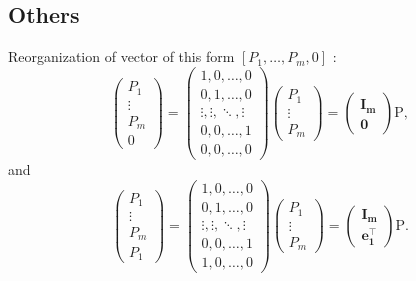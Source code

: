 \documentclass[11pt]{article}
\newcommand{\vP}{\bm{\mathrm{P}}} %
\begin{document}
\subsection{Others}
Reorganization of vector of this form $[P_1, \dots, P_m, 0]$ :
\[
\begin{pmatrix}
P_1 \\
\vdots \\
P_m \\
0
\end{pmatrix}
=
\begin{pmatrix}
1, 0, \dots, 0 \\
0, 1, \dots, 0 \\
\vdots, \vdots, \ddots, \vdots \\
0, 0, \dots, 1 \\
0, 0, \dots, 0
\end{pmatrix}
\begin{pmatrix}
P_1 \\
\vdots \\
P_m
\end{pmatrix}
=
\begin{pmatrix}
\bm{I_m} \\
\bm{0}
\end{pmatrix}
\vP,
\]
and
\[
\begin{pmatrix}
P_1 \\
\vdots \\
P_m \\
P_1
\end{pmatrix}
=
\begin{pmatrix}
1, 0, \dots, 0 \\
0, 1, \dots, 0 \\
\vdots, \vdots, \ddots, \vdots \\
0, 0, \dots, 1 \\
1, 0, \dots, 0
\end{pmatrix}
\begin{pmatrix}
P_1 \\
\vdots \\
P_m
\end{pmatrix}
=
\begin{pmatrix}
\bm{I_m} \\
\bm{e_1^{\intercal}}
\end{pmatrix}
\vP.
\]
\end{document}
